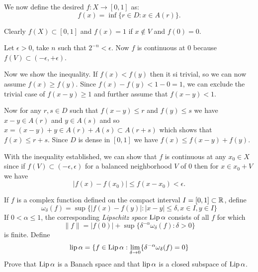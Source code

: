 \begin{enumerate}
We now define the desired \(f: X \rightarrow [0,1]\) as:
\begin{equation*}
f(x) = \inf\{r\in D: x\in A(r)\}.
\end{equation*}

Clearly \(f(X) \subset [0,1]\) and
\(f(x) = 1\) if \(x\notin V\) and \(f(0) = 0\).


Let \(\epsilon > 0\), take $n$ such that \(2^{-n} < \epsilon\).
Now $f$ is continuous at $0$ because \(f(V) \subset (-\epsilon, +\epsilon)\).

Now we show the inequality. If \(f(x) < f(y)\) then it si trivial,
so we can now assume \(f(x)\geq f(y)\).
Since \(f(x) - f(y) < 1 - 0 = 1\),
we can exclude the trivial case of  \(f(x-y) \geq 1\) and
further assume that \(f(x-y) < 1\).

Now for any \(r,s\in D\) such that 
\(f(x-y)\leq r\) and
\(f(y)\leq s\) we have
\(x-y \in  A(r)\) and
\(y \in  A(s)\) and so \(x=(x-y)+y \in A(r) + A(s) \subset A(r+s)\)
which shows that \(f(x) \leq r + s\). Since $D$ is dense in  \([0,1]\)
we have \(f(x) \leq f(x-y) + f(y)\).

With the inequality established, we can show that $f$ is continuous
at any \(x_0\in X\) since if \(f(V) \subset (-\epsilon, \epsilon)\)
for a balanced neighborhood $V$ of $0$ 
then for \(x \in x_0 + V\) we have
\begin{equation*}
|f(x)- f(x_0)| \leq f(x - x_0) < \epsilon.
\end{equation*}


\begin{excopy}
If $f$ is a complex  function defined on the compact interval 
\(I=[0,1]\subset \mathbb{R}\), define
\begin{equation*}
 \omega_\delta(f) = \sup \{|f(x) - f(y)|: |x-y|\leq \delta, x\in I, y\in I\}
\end{equation*}
If \(0<\alpha \leq 1\), the corresponding 
\emph{Lipschitz space} \(\mathop{\rm Lip}\nolimits \alpha\) consists of all $f$ for which
\begin{equation*}
 \|f\| = |f(0)| + \sup\{\delta^{-\alpha} \omega_\delta(f): \delta > 0\}
\end{equation*}
is finite. Define
\begin{equation*}
 \mathop{\rm lip}\nolimits \alpha = \{f\in \mathop{\rm Lip}\nolimits \alpha: 
           \lim_{\delta\rightarrow 0} \{\delta^{-\alpha} \omega_\delta(f) = 0\}
\end{equation*}
Prove that \(\mathop{\rm Lip}\nolimits \alpha\) is a 
Banach space and that \(\mathop{\rm lip}\nolimits \alpha\) is a closed subspace of \(\mathop{\rm Lip}\nolimits \alpha\).
\end{excopy}


\end{enumerate}
